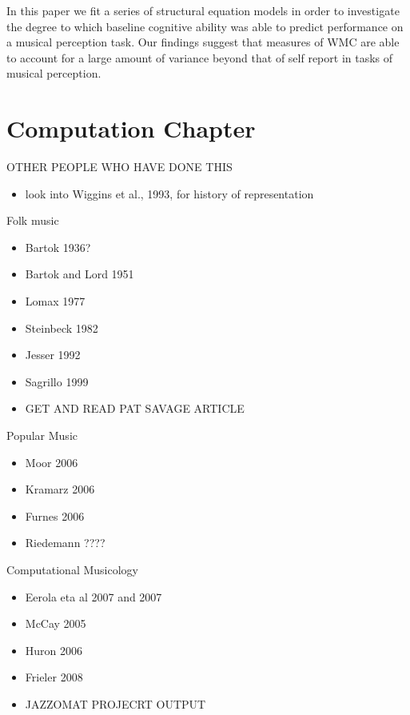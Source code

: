 \documentclass[]{book}
\providecommand{\tightlist}{%
  \setlength{\itemsep}{0pt}\setlength{\parskip}{0pt}}
\theoremstyle{definition}
\theoremstyle{definition}
\theoremstyle{definition}
\theoremstyle{remark}
\begin{document}
In this paper we fit a series of structural equation models in order to
investigate the degree to which baseline cognitive ability was able to
predict performance on a musical perception task. Our findings suggest
that measures of WMC are able to account for a large amount of variance
beyond that of self report in tasks of musical perception.

\hypertarget{computation-chapter}{%
\chapter{Computation Chapter}\label{computation-chapter}}

OTHER PEOPLE WHO HAVE DONE THIS

\begin{itemize}
\tightlist
\item
  look into Wiggins et al., 1993, for history of representation
\end{itemize}

Folk music

\begin{itemize}
\item
  Bartok 1936?
\item
  Bartok and Lord 1951
\item
  Lomax 1977
\item
  Steinbeck 1982
\item
  Jesser 1992
\item
  Sagrillo 1999
\item
  GET AND READ PAT SAVAGE ARTICLE
\end{itemize}

Popular Music

\begin{itemize}
\tightlist
\item
  Moor 2006
\item
  Kramarz 2006
\item
  Furnes 2006
\item
  Riedemann ????
\end{itemize}

Computational Musicology

\begin{itemize}
\tightlist
\item
  Eerola eta al 2007 and 2007
\item
  McCay 2005
\item
  Huron 2006
\item
  Frieler 2008
\item
  JAZZOMAT PROJECRT OUTPUT
\end{itemize}
\end{document}
